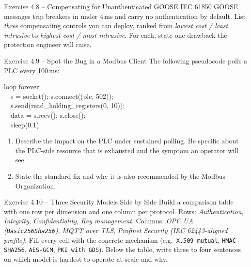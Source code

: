 \documentclass[11pt,a4paper]{article}
\begin{document}
\begin{taskbox}{Exercise 4.8 -- Compensating for Unauthenticated GOOSE}
IEC 61850 GOOSE messages trip breakers in under 4\,ms and carry no
authentication by default. List \emph{three} compensating controls you can
deploy, ranked from \emph{lowest cost / least intrusive} to \emph{highest
cost / most intrusive}. For each, state one drawback the protection engineer
will raise.
\end{taskbox}

\begin{taskbox}{Exercise 4.9 -- Spot the Bug in a Modbus Client}
The following pseudocode polls a PLC every 100\,ms:
\begin{center}\ttfamily
loop forever:\\
\ \ s = socket(); s.connect((plc, 502));\\
\ \ s.send(read\_holding\_registers(0, 10));\\
\ \ data = s.recv(); s.close();\\
\ \ sleep(0.1)
\end{center}
\begin{enumerate}
  \item Describe the impact on the PLC under sustained polling. Be specific
        about the PLC-side resource that is exhausted and the symptom an
        operator will see.
  \item State the standard fix and why it is also recommended by the
        Modbus Organization.
\end{enumerate}
\end{taskbox}

\begin{taskbox}{Exercise 4.10 -- Three Security Models Side by Side}
Build a comparison table with one row per dimension and one column per
protocol. Rows: \emph{Authentication}, \emph{Integrity},
\emph{Confidentiality}, \emph{Key management}. Columns: \emph{OPC UA
(\texttt{Basic256Sha256})}, \emph{MQTT over TLS}, \emph{Profinet Security
(IEC 62443-aligned profile)}. Fill every cell with the concrete mechanism
(e.g.\ \texttt{X.509 mutual}, \texttt{HMAC-SHA256}, \texttt{AES-GCM},
\texttt{PKI with GDS}). Below the table, write three to four sentences on
which model is hardest to operate at scale and why.
\end{taskbox}
\end{document}
